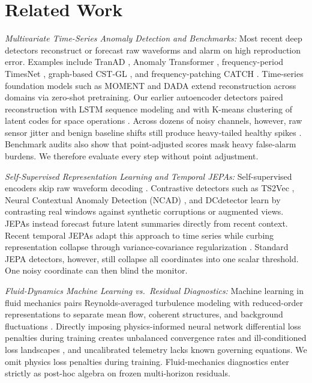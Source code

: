 \section{Related Work}
\label{sec:related}

\noindent\emph{Multivariate Time-Series Anomaly Detection and Benchmarks:} Most recent deep detectors reconstruct or forecast raw waveforms and alarm on high reproduction error. Examples include TranAD \cite{tuli2022tranad}, Anomaly Transformer \cite{xu2022anomaly}, frequency-period TimesNet \cite{wu2023timesnet}, graph-based CST-GL \cite{zheng2024cstgl}, and frequency-patching CATCH \cite{wu2025catch}. Time-series foundation models such as MOMENT \cite{goswami2024moment} and DADA \cite{shentu2025dada} extend reconstruction across domains via zero-shot pretraining. Our earlier autoencoder detectors paired reconstruction with LSTM sequence modeling \cite{akbarian2023aelstm} and with K-means clustering of latent codes for space operations \cite{akbarian2024aekmeans}. Across dozens of noisy channels, however, raw sensor jitter and benign baseline shifts still produce heavy-tailed healthy spikes \cite{schmidl2022anomaly}. Benchmark audits \cite{kim2022towards, wu2023flawed, liu2024tsbad, zhou2026mtsbench} also show that point-adjusted scores mask heavy false-alarm burdens. We therefore evaluate every step without point adjustment.

\noindent\emph{Self-Supervised Representation Learning and Temporal JEPAs:} Self-supervised encoders skip raw waveform decoding \cite{zhang2023self}. Contrastive detectors such as TS2Vec \cite{yue2022ts2vec}, Neural Contextual Anomaly Detection (NCAD) \cite{carmona2021neural}, and DCdetector \cite{yang2023dcdetector} learn by contrasting real windows against synthetic corruptions or augmented views. JEPAs \cite{lecun2022path, assran2023self, bardes2024vjepa} instead forecast future latent summaries directly from recent context. Recent temporal JEPAs \cite{ennadir2025tsjepa} adapt this approach to time series while curbing representation collapse through variance-covariance regularization \cite{bardes2021vicreg, garrido2023rankme}. Standard JEPA detectors, however, still collapse all coordinates into one scalar threshold. One noisy coordinate can then blind the monitor.

\noindent\emph{Fluid-Dynamics Machine Learning vs.\ Residual Diagnostics:} Machine learning in fluid mechanics pairs Reynolds-averaged turbulence modeling with reduced-order representations to separate mean flow, coherent structures, and background fluctuations \cite{vinuesa2022enhancing}. Directly imposing physics-informed neural network differential loss penalties during training creates unbalanced convergence rates \cite{wang2022pinns} and ill-conditioned loss landscapes \cite{rathore2024challenges}, and uncalibrated telemetry lacks known governing equations. We omit physics loss penalties during training. Fluid-mechanics diagnostics enter strictly as post-hoc algebra on frozen multi-horizon residuals.

